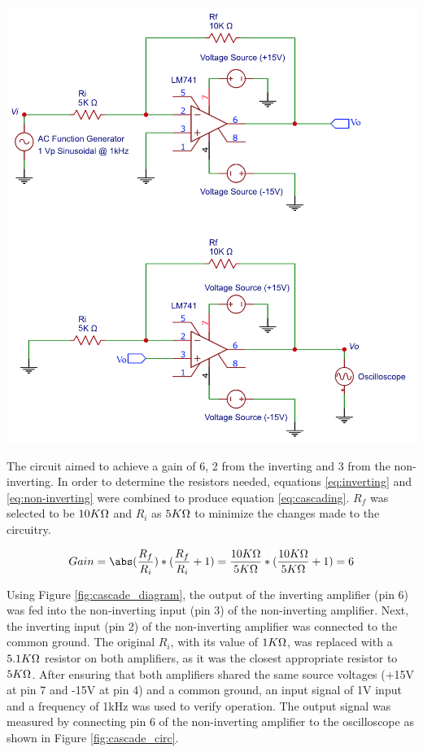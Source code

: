 \documentclass[journal]{IEEEtran}
\begin{document}
\begingroup
    \centering
    \medskip
    \includegraphics[width=\columnwidth]{images/lab7_cascading.png}
    \label{fig:cascade_diagram}
    \medskip
\endgroup

The circuit aimed to achieve a gain of 6, 2 from the inverting and 3 from the non-inverting. In order to determine the resistors needed, equations \ref{eq:inverting} and \ref{eq:non-inverting} were combined to produce equation \ref{eq:cascading}. $R_f$ was selected to be $10K\ohm$ and $R_i$ as $5K\ohm$ to minimize the changes made to the circuitry.

\begin{equation}
Gain = \abs(\frac{R_f}{R_i}) * (\frac{R_f}{R_i} + 1) = \frac{10K\ohm}{5K\ohm} * (\frac{10K\ohm}{5K\ohm} + 1) =  6
\label{eq:cascading}
\end{equation}

\bigskip
    
\noindent Using Figure \ref{fig:cascade_diagram}, the output of the inverting amplifier (pin 6) was fed into the non-inverting input (pin 3) of the non-inverting amplifier. Next, the inverting input (pin 2) of the non-inverting amplifier was connected to the common ground. The original $R_i$, with its value of $1K\ohm$, was replaced with a $5.1K\ohm$ resistor on both amplifiers, as it was the closest appropriate resistor to $5K\ohm$. After ensuring that both amplifiers shared the same source voltages (+15V at pin 7 and -15V at pin 4) and a common ground, an input signal of 1V input and a frequency of 1kHz was used to verify operation. The output signal was measured by connecting pin 6 of the non-inverting amplifier to the oscilloscope as shown in Figure \ref{fig:cascade_circ}.
\end{document}
